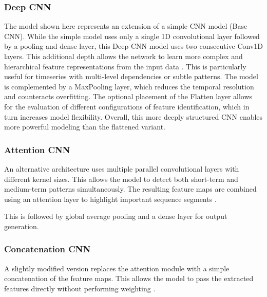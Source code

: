 \subsubsection{Deep CNN}

The model shown here represents an extension of a simple CNN model (Base CNN).
While the simple model uses only a single 1D convolutional layer followed by a pooling and dense layer, this Deep CNN model uses two consecutive Conv1D layers.
This additional depth allows the network to learn more complex and hierarchical feature representations from the input data \cite{cnn-deep-more-complex}.
This is particularly useful for timeseries with multi-level dependencies or subtle patterns.
The model is complemented by a MaxPooling layer, which reduces the temporal resolution and counteracts overfitting.
The optional placement of the Flatten layer allows for the evaluation of different configurations of feature identification, which in turn increases model flexibility.
Overall, this more deeply structured CNN enables more powerful modeling than the flattened variant.



\subsubsection{Attention CNN}

An alternative architecture uses multiple parallel convolutional layers with different kernel sizes.
This allows the model to detect both short-term and medium-term patterns simultaneously.
The resulting feature maps are combined using an attention layer to highlight important sequence segments \cite{cnn-attention}.

This is followed by global average pooling and a dense layer for output generation.



\subsubsection{Concatenation CNN}

A slightly modified version replaces the attention module with a simple concatenation of the feature maps.
This allows the model to pass the extracted features directly without performing weighting \cite{keras-concat}.

